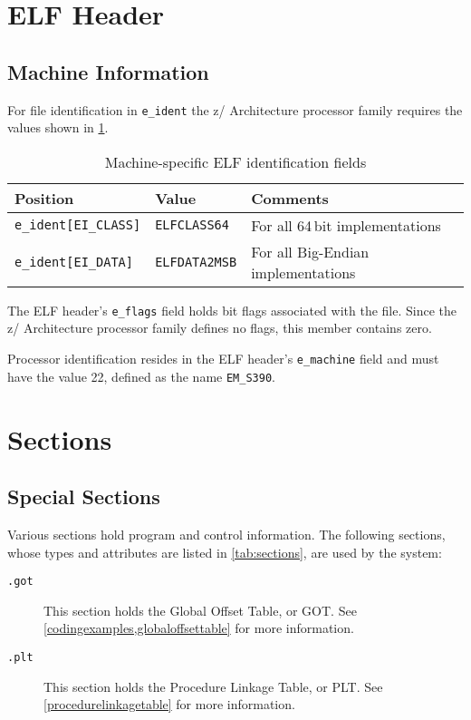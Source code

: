 \documentclass[english,11pt,twoside,toc=bib,toc=idx]{scrreprt}
\newcommand{\NBITS}{64}
\newcommand{\ARCH}{z/\kern-1pt Ar\-chi\-tec\-ture}
\newcommand{\NBITS}{32}
\newcommand{\ARCH}{ESA/390}
\newenvironment{DIFnomarkup}{}{} %
\begin{document}
\section{ELF Header}
\subsection{Machine Information}
For file identification in \texttt{e\_ident} the \ARCH{} processor
family requires the values shown in \cref{tab:eident}.

\begin{table}
  \centering
  \begin{DIFnomarkup}
  \begin{tabular}{lll}
    \toprule
    Position & Value & Comments \\
    \midrule
    \texttt{e\_ident[EI\_CLASS]} & \texttt{ELFCLASS\NBITS{}} &
    For all \NBITS{}$\,$bit implementations \\
    \texttt{e\_ident[EI\_DATA]} & \texttt{ELFDATA2MSB} &
    For all Big-Endian implementations \\
    \bottomrule
  \end{tabular}
  \end{DIFnomarkup}
  \caption{Machine-specific ELF identification fields}
  \label{tab:eident}
\end{table}

The ELF header's \texttt{e\_flags} field holds bit flags associated
with the file.  Since the \ARCH{} processor family defines no flags,
this member contains zero.

Processor identification resides in the ELF header's
\texttt{e\_machine} field and must have the value 22, defined as the
name \texttt{EM\_S390}.

\section{Sections}
\subsection{Special Sections}
Various sections hold program and control information.  The following
sections, whose types and attributes are listed in \cref{tab:sections},
are used by the system:
\begin{description}
\item[\texttt{.got}]  This
  section holds the Global Offset Table, or GOT\@.  See
  \cref{codingexamples,globaloffsettable} for more information.
\item[\texttt{.plt}]  This
  section holds the Procedure Linkage Table, or PLT.  See
  \cref{procedurelinkagetable} for more information.
\end{description}
\end{document}
